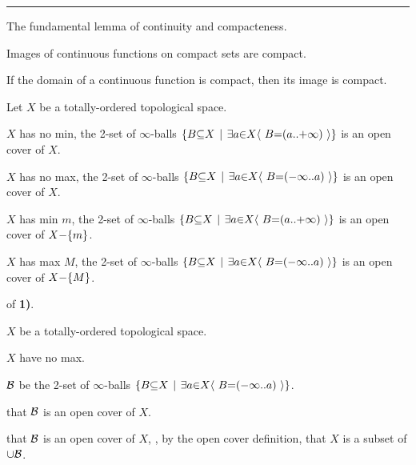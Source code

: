 \vs\hrule\vskip1pt
\lemma The fundamental lemma of continuity and compacteness. \par
Images of continuous functions on compact sets are compact. \par
If the domain of a continuous function is compact, then its image is compact. \par

\vs
\lemma \par
Let $X$ be a totally-ordered topological space. \par
    $X$ has no min,   the 2-set of $\infty$-balls $\a\{B \p\subseteq X \pipe \a\exists a \p\in X \a\langle~ B \p= \a(a         \a{..} \p+\infty\a) ~\a\rangle \a\}$ is an open cover of $X$. \par
    $X$ has no max,   the 2-set of $\infty$-balls $\a\{B \p\subseteq X \pipe \a\exists a \p\in X \a\langle~ B \p= \a(\p-\infty \a{..}         a\a) ~\a\rangle \a\}$ is an open cover of $X$. \par
    $X$ has min $m$,  the 2-set of $\infty$-balls $\a\{B \p\subseteq X \pipe \a\exists a \p\in X \a\langle~ B \p= \a(a         \a{..} \p+\infty\a) ~\a\rangle \a\}$ is an open cover of $X \p- \a\{m\a\}$. \par
    $X$ has max $M$,  the 2-set of $\infty$-balls $\a\{B \p\subseteq X \pipe \a\exists a \p\in X \a\langle~ B \p= \a(\p-\infty \a{..}         a\a) ~\a\rangle \a\}$ is an open cover of $X \p- \a\{M\a\}$. \par

 of {\bf 1)}. \par
{} $X$ be a totally-ordered topological space. \par
{} $X$ have no max. \par
{} ${\cal B}$ be the 2-set of $\infty$-balls $\a\{B \p\subseteq X \pipe \a\exists a \p\in X \a\langle~ B \p= \a(\p-\infty \a{..} a\a) ~\a\rangle \a\}$. \par

 that ${\cal B}$ is an open cover of $X$. \par
{}  that ${\cal B}$ is an open cover of $X$, , by the open cover definition,  that $X$ is a subset of $\p\cup{\cal B}$. \par


